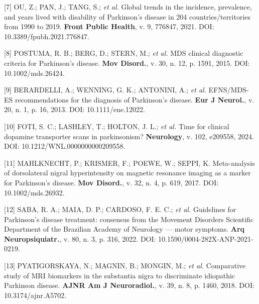\documentclass[12pt,a4paper,oneside]{article}
\begin{document}
\begin{singlespace}
\noindent\hangindent=1.25cm\label{ref:trends}
[7] OU, Z.; PAN, J.; TANG, S.; \textit{et al.} Global trends in the
incidence, prevalence, and years lived with disability of
Parkinson's disease in 204 countries/territories from 1990 to 2019.
\textbf{Front Public Health}, v. 9, 776847, 2021. DOI:
10.3389/fpubh.2021.776847.\par\smallskip

\noindent\hangindent=1.25cm\label{ref:mds-criteria}
[8] POSTUMA, R. B.; BERG, D.; STERN, M.; \textit{et al.} MDS
clinical diagnostic criteria for Parkinson's disease.
\textbf{Mov Disord.}, v. 30, n. 12, p. 1591, 2015.
DOI: 10.1002/mds.26424.\par\smallskip

\noindent\hangindent=1.25cm\label{ref:efns-mds}
[9] BERARDELLI, A.; WENNING, G. K.; ANTONINI, A.; \textit{et al.}
EFNS/MDS-ES recommendations for the diagnosis of Parkinson's
disease. \textbf{Eur J Neurol.}, v. 20, n. 1, p. 16,
2013. DOI: 10.1111/ene.12022.\par\smallskip

\noindent\hangindent=1.25cm\label{ref:aan}
[10] FOTI, S. C.; LASHLEY, T.; HOLTON, J. L.; \textit{et al.} Time
for clinical dopamine transporter scans in parkinsonism?
\textbf{Neurology}, v. 102, e209558, 2024. DOI:
10.1212/WNL.0000000000209558.\par\smallskip

\noindent\hangindent=1.25cm\label{ref:swallow}
[11] MAHLKNECHT, P.; KRISMER, F.; POEWE, W.; SEPPI, K. Meta-analysis
of dorsolateral nigral hyperintensity on magnetic resonance imaging
as a marker for Parkinson's disease. \textbf{Mov Disord.}, v. 32,
n. 4, p. 619, 2017. DOI: 10.1002/mds.26932.\par\smallskip

\noindent\hangindent=1.25cm\label{ref:saba}
[12] SABA, R. A.; MAIA, D. P.; CARDOSO, F. E. C.; \textit{et al.}
Guidelines for Parkinson's disease treatment: consensus from the
Movement Disorders Scientific Department of the Brazilian Academy
of Neurology — motor symptoms. \textbf{Arq Neuropsiquiatr.}, v. 80,
n. 3, p. 316, 2022. DOI:
10.1590/0004-282X-ANP-2021-0219.\par\smallskip

\noindent\hangindent=1.25cm\label{ref:pyatigorskaya}
[13] PYATIGORSKAYA, N.; MAGNIN, B.; MONGIN, M.; \textit{et al.}
Comparative study of MRI biomarkers in the substantia nigra to
discriminate idiopathic Parkinson disease. \textbf{AJNR Am J
Neuroradiol.}, v. 39, n. 8, p. 1460, 2018. DOI:
10.3174/ajnr.A5702.\par\smallskip


\end{singlespace}
\end{document}
